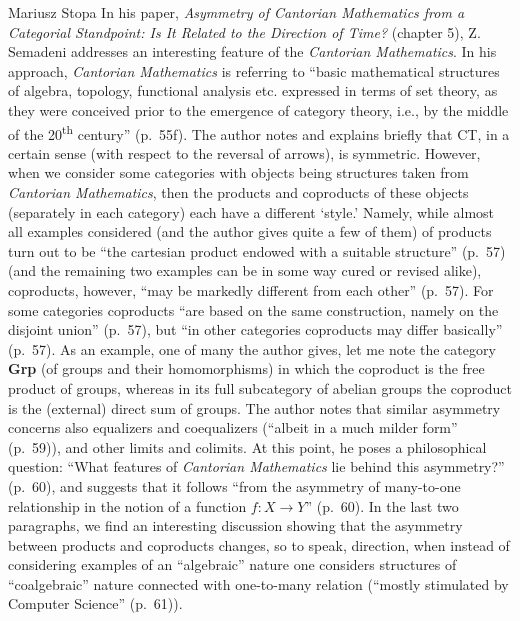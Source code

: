\begin{recengenv}{Mariusz Stopa}
\enlargethispage{-.5\baselineskip}
In his paper, \textit{Asymmetry of Cantorian Mathematics from a Categorial Standpoint: Is It Related to the Direction of Time?} (chapter 5), Z. Semadeni addresses an interesting feature of the \textit{Cantorian Mathematics}. In his approach, \textit{Cantorian Mathematics} is referring to ``basic mathematical structures of algebra, topology, functional analysis etc. expressed in terms of set theory, as they were conceived prior to the emergence of cat\-e\-go\-ry theory, i.e., by the middle of the 20\textsuperscript{th} century'' (p.~55f). The author notes and explains briefly that CT, in a certain sense (with respect to the reversal of arrows), is symmetric. However, when we consider some cat\-e\-gories with objects being structures taken from \textit{Cantorian Mathematics}, then the products and coproducts of these objects (separately in each cat\-e\-go\-ry) each have a different `style.' Namely, while almost all examples considered (and the author gives quite a few of them) of products turn out to be ``the cartesian product endowed with a suitable structure'' (p.~57) (and the remaining two examples can be in some way cured or revised alike), coproducts, however, ``may be markedly different from each other'' (p.~57). For some cat\-e\-gories coproducts ``are based on the same construction, namely on the disjoint union'' (p.~57), but ``in other cat\-e\-gories coproducts may differ basically'' (p.~57). As an example, one of many the author gives, let me note the cat\-e\-go\-ry \textbf{Grp} (of groups and their homomorphisms) in which the coproduct is the free product of groups, whereas in its full subcat\-e\-go\-ry of abelian groups the coproduct is the (external) direct sum of groups. The author notes that similar asymmetry concerns also equalizers and coequalizers (``albeit in a much milder form'' (p.~59)), and other limits and colimits. At this point, he poses a philosophical question: ``What features of \textit{Cantorian Mathematics} lie behind this asymmetry?'' (p.~60), and suggests that it follows ``from the asymmetry of many-to-one relationship in the notion of a function $ f:X\to Y $'' (p.~60). In the last two paragraphs, we find an interesting discussion showing that the asymmetry between products and coproducts changes, so to speak, direction, when instead of considering examples of an ``algebraic'' nature one considers structures of ``coalgebraic'' nature connected with one-to-many relation (``mostly stimulated by Computer Science'' (p.~61)).


\end{recengenv}
